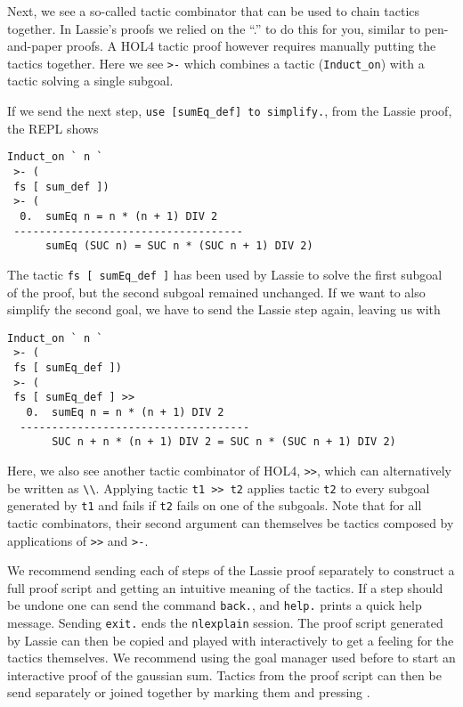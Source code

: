 Next, we see a so-called tactic combinator that can be used to chain tactics
together.
In Lassie's proofs we relied on the ``.'' to do this for you, similar to
pen-and-paper proofs.
A HOL4 tactic proof however requires manually putting the tactics together.
Here we see \lstinline{>-} which combines a tactic (\lstinline{Induct_on})
with a tactic solving a single subgoal.

If we send the next step, \lstinline{use [sumEq_def] to simplify.}, from the Lassie proof, the REPL shows
%
\begin{lstlisting}[frame=single]
Induct_on ` n `
 >- (
 fs [ sum_def ])
 >- (
  0.  sumEq n = n * (n + 1) DIV 2
 ------------------------------------
      sumEq (SUC n) = SUC n * (SUC n + 1) DIV 2)
\end{lstlisting}

The tactic \lstinline{fs [ sumEq_def ]} has been used by Lassie to solve the first subgoal
of the proof, but the second subgoal remained unchanged.
If we want to also simplify the second goal, we have to send the Lassie step again,
leaving us with
%
\begin{lstlisting}[frame=single]
Induct_on ` n `
 >- (
 fs [ sumEq_def ])
 >- (
 fs [ sumEq_def ] >>
   0.  sumEq n = n * (n + 1) DIV 2
  ------------------------------------
       SUC n + n * (n + 1) DIV 2 = SUC n * (SUC n + 1) DIV 2)
\end{lstlisting}

Here, we also see another tactic combinator of HOL4, \lstinline{>>}, which can
alternatively be written as \lstinline{\\}.
Applying tactic \lstinline{t1 >> t2} applies tactic \lstinline{t2} to every
subgoal  generated by \lstinline{t1} and fails if \lstinline{t2} fails on one of
the subgoals.
Note that for all tactic combinators, their second argument can themselves be
tactics composed by applications of \lstinline{>>} and \lstinline{>-}.

We recommend sending each of steps of the Lassie proof separately to construct a
full proof script and getting an intuitive meaning of the tactics.
If a step should be undone one can send the command \lstinline{back.}, and
\lstinline{help.} prints a quick help message.
Sending \lstinline{exit.} ends the \lstinline{nlexplain} session.
The proof script generated by Lassie can then be copied and played with
interactively to get a feeling for the tactics themselves.
We recommend using the goal manager used before to start an interactive proof of
the gaussian sum.
Tactics from the proof script can then be send separately or joined together by
marking them and pressing .